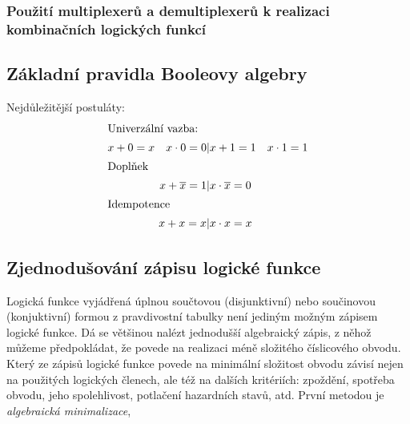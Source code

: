       \subsubsection{Použití multiplexerů a demultiplexerů k realizaci kombinačních logických funkcí}
   
  \subsection{Základní pravidla Booleovy algebry}\label{CES:basic_bool_alg}
    Nejdůležitější postuláty:
    \begin{align}
       \shortintertext{Univerzální vazba:}
         x + 0 = x \quad x\cdot 0 = 0 &|  x + 1 = 1 \quad x\cdot 1 = 1                         \\
       \shortintertext{Doplňek}
         x + \overline{x} = 1         &|  x\cdot\overline{x} = 0                               \\
       \shortintertext{Idempotence}
         x +x = x                     &|  x\cdot x = x      
      \label{CES:postul_Idemp}
    \end{align}
  \subsection{Zjednodušování zápisu logické funkce}
     Logická funkce vyjádřená úplnou součtovou (disjunktivní) nebo součinovou (konjuktivní) formou 
     z pravdivostní tabulky není jediným možným zápisem logické funkce. Dá se většinou nalézt 
     jednodušší algebraický zápis, z něhož můžeme předpokládat, že povede na realizaci méně 
     složitého číslicového obvodu. Který ze zápisů logické funkce povede na minimální složitost 
     obvodu závisí nejen na použitých logických členech, ale též na dalších kritériích: zpoždění, 
     spotřeba obvodu, jeho spolehlivost, potlačení hazardních stavů, atd. První metodou je 
     \emph{algebraická minimalizace}, 
     
